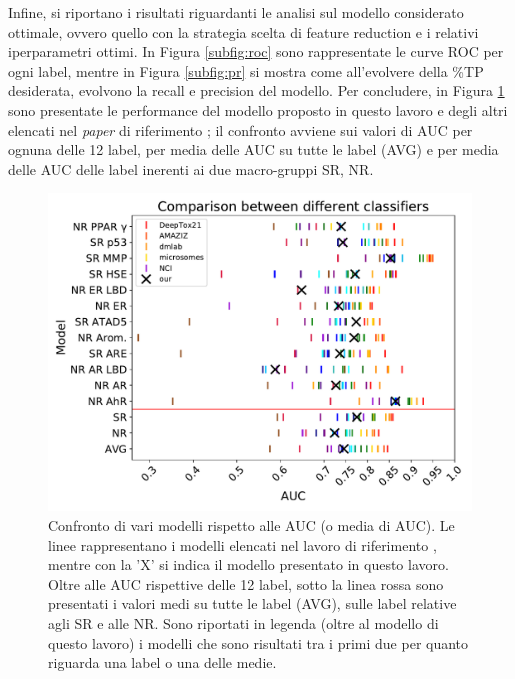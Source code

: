 Infine, si riportano i risultati riguardanti le analisi sul modello considerato ottimale, ovvero quello con la strategia scelta di feature reduction e i relativi iperparametri ottimi.
In Figura \ref{subfig:roc} sono rappresentate le curve ROC per ogni label, mentre in Figura \ref{subfig:pr} si mostra come all'evolvere della \%TP desiderata, evolvono la recall e precision del modello.
Per concludere, in Figura \ref{fig:comparison} sono presentate le performance del modello proposto in questo lavoro e degli altri elencati nel \textit{paper} di riferimento \cite{mayr2016deeptox}; il confronto avviene sui valori di AUC per ognuna delle 12 label, per media delle AUC su tutte le label (AVG) e per media delle AUC delle label inerenti ai due macro-gruppi SR, NR.
\begin{figure}[!t]
	\centering
	\includegraphics[width=0.9\linewidth]{../images/pdf/comparison}
	\caption{Confronto di vari modelli rispetto alle AUC (o media di AUC). Le linee rappresentano i modelli elencati nel lavoro di riferimento \cite{mayr2016deeptox}, mentre con la 'X' si indica il modello presentato in questo lavoro. Oltre alle AUC rispettive delle 12 label, sotto la linea rossa sono presentati i valori medi su tutte le label (AVG), sulle label relative agli SR e alle NR. Sono riportati in legenda (oltre al modello di questo lavoro) i modelli che sono risultati tra i primi due per quanto riguarda una label o una delle medie.}
	\label{fig:comparison}
\end{figure}